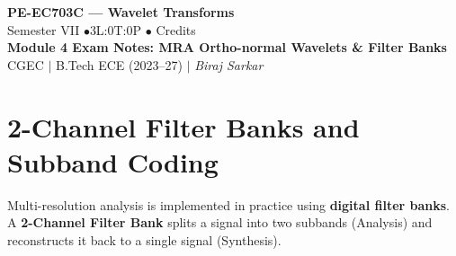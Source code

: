 \documentclass[12pt,a4paper]{article}
\begin{document}

\begin{center}
  {\LARGE\bfseries\color{myred} PE-EC703C --- Wavelet Transforms}\\[5pt]
  {\normalsize\color{mydark} Semester VII \quad$\bullet$\quad 3L:0T:0P \quad$\bullet$ Credits}\\[3pt]
  {\normalsize\color{myteal}\textbf{Module 4 Exam Notes: MRA Ortho-normal Wavelets \& Filter Banks}}\\[3pt]
  {\small\color{mydark} CGEC \;$|$\; B.Tech ECE (2023--27) \;$|$\; \textit{Biraj Sarkar}}
\end{center}
\vspace{2pt}
\noindent{\color{myred}\rule{\linewidth}{1.5pt}}
\vspace{2pt}

\hypersetup{linkcolor=mydark}
\tableofcontents
\hypersetup{linkcolor=myteal}
\newpage

\section{2-Channel Filter Banks and Subband Coding}

Multi-resolution analysis is implemented in practice using \textbf{digital filter banks}. A \textbf{2-Channel Filter Bank} splits a signal into two subbands (Analysis) and reconstructs it back to a single signal (Synthesis).
\end{document}
